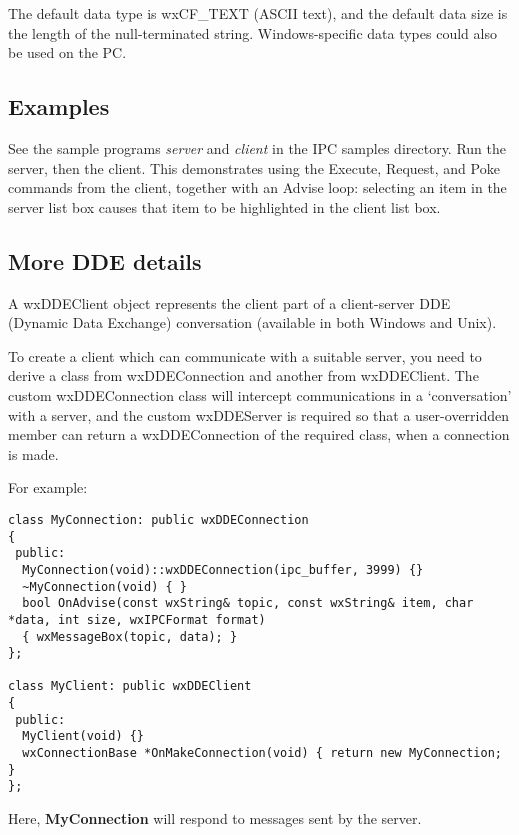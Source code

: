 The default data type is wxCF\_TEXT (ASCII text), and the default data
size is the length of the null-terminated string. Windows-specific data
types could also be used on the PC.

\subsection{Examples}

See the sample programs {\it server}\/ and {\it client}\/ in the IPC
samples directory.  Run the server, then the client. This demonstrates
using the Execute, Request, and Poke commands from the client, together
with an Advise loop: selecting an item in the server list box causes
that item to be highlighted in the client list box.

\subsection{More DDE details}

A wxDDEClient object represents the client part of a client-server DDE
(Dynamic Data Exchange) conversation (available in both
Windows and Unix).

To create a client which can communicate with a suitable server,
you need to derive a class from wxDDEConnection and another from wxDDEClient.
The custom wxDDEConnection class will intercept communications in
a `conversation' with a server, and the custom wxDDEServer is required
so that a user-overridden  member can return
a wxDDEConnection of the required class, when a connection is made.

For example:

\begin{verbatim}
class MyConnection: public wxDDEConnection
{
 public:
  MyConnection(void)::wxDDEConnection(ipc_buffer, 3999) {}
  ~MyConnection(void) { }
  bool OnAdvise(const wxString& topic, const wxString& item, char *data, int size, wxIPCFormat format)
  { wxMessageBox(topic, data); }
};

class MyClient: public wxDDEClient
{
 public:
  MyClient(void) {}
  wxConnectionBase *OnMakeConnection(void) { return new MyConnection; }
};

\end{verbatim}

Here, {\bf MyConnection} will respond to  messages sent
by the server.

